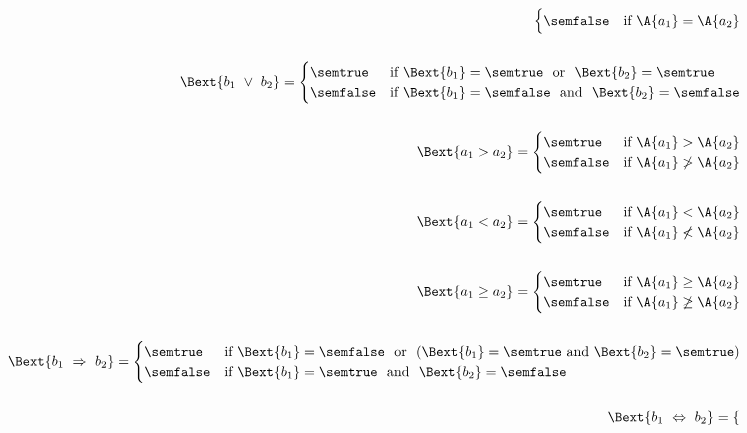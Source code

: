 \begin{enumerate}[label=(\alph*)]
\begin{align*}
\begin{cases}
  \semfalse & 
  \mbox{if}  \ \A{a_1} = \A{a_2}\\
  \end{cases} \\ \\
\Bext{b_1 \ \lor \ b_2} = 
  \begin{cases} 
  \semtrue & 
  \mbox{if} \ \Bext{b_1} = \semtrue \ \mbox{ or } \ 
            \Bext{b_2} = \semtrue \\ 
  \semfalse & 
  \mbox{if} \ \Bext{b_1} = \semfalse \ \mbox{ and } \ 
            \Bext{b_2} = \semfalse \\ 
  \end{cases} \\ \\
\Bext{a_1 > a_2} = 
  \begin{cases} 
  \semtrue & 
  \mbox{if} \ \A{a_1} > \A{a_2}\\ 
  \semfalse & 
  \mbox{if} \ \A{a_1} \not > \A{a_2}\\
  \end{cases} \\ \\
\Bext{a_1 < a_2} = 
  \begin{cases} 
  \semtrue & 
  \mbox{if} \ \A{a_1} < \A{a_2}\\ 
  \semfalse & 
  \mbox{if} \ \A{a_1} \not < \A{a_2}\\
  \end{cases} \\ \\
\Bext{a_1 \geq a_2} = 
  \begin{cases} 
  \semtrue & 
  \mbox{if} \ \A{a_1} \geq \A{a_2}\\ 
  \semfalse & 
  \mbox{if} \ \A{a_1} \not \geq \A{a_2}\\
  \end{cases} \\ \\
\Bext{b_1 \ \Rightarrow \ b_2} = 
  \begin{cases} 
  \semtrue & 
  \mbox{if} \ \Bext{b_1} = \semfalse \ \mbox{ or } \
            (\Bext{b_1} = \semtrue \ \mbox{and} \ \Bext{b_2} = \semtrue)\\ 
  \semfalse & 
  \mbox{if} \ \Bext{b_1} = \semtrue \ \mbox{ and } \ 
            \Bext{b_2} = \semfalse \\ 
  \end{cases} \\ \\
\Bext{b_1 \ \Leftrightarrow \ b_2} = 
  \begin{cases} 

\end{cases}
\end{align*}
\end{enumerate}
